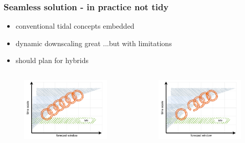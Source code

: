 \begin{frame}
\frametitle{Seamless solution  - in practice not tidy}
\begin{minipage}{1.0\textwidth}
    \begin{itemize}
        \item conventional tidal concepts embedded
        \item dynamic downscaling great ...but with limitations
        \item should plan for hybrids
    \end{itemize}
\end{minipage}
\hfill
\begin{minipage}{1.0\textwidth}
\begin{columns}
    \begin{column}{0.4\textwidth}
    \begin{figure}      
        \includegraphics[width=\textwidth]{figures/diagrams/scales_with_chain.pdf}
    \end{figure}
    \end{column}

    \begin{column}{0.4\textwidth}
    \begin{figure}      
        \includegraphics[width=\textwidth]{figures/diagrams/scales_with_broken_chain.pdf}
    \end{figure}
    \end{column}
    

\end{columns}
\end{minipage}
\end{frame}
